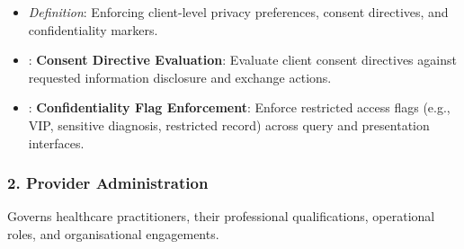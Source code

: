\begin{itemize}
\begin{itemize}

\item 
\emph{Definition}: Enforcing client-level privacy preferences, consent directives, and confidentiality markers.



\item 
\texttt{}: \textbf{Consent Directive Evaluation}: Evaluate client consent directives against requested information disclosure and exchange actions.



\item 
\texttt{}: \textbf{Confidentiality Flag Enforcement}: Enforce restricted access flags (e.g., VIP, sensitive diagnosis, restricted record) across query and presentation interfaces.



\end{itemize}


\end{itemize}
\label{rad:enabling:137}
\subsubsection*{2. Provider Administration}
\label{rad:enabling:138}

Governs healthcare practitioners, their professional qualifications, operational roles, and organisational engagements.

\label{rad:enabling:140}

